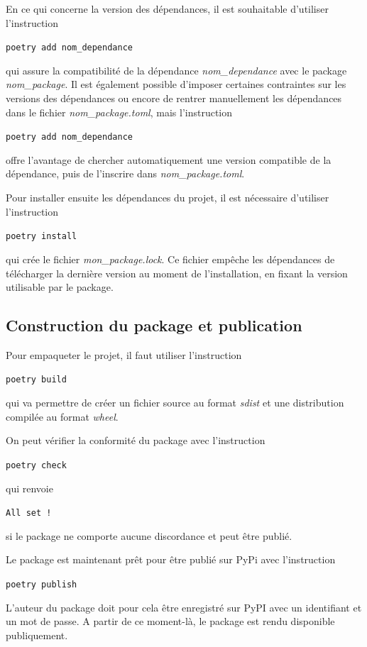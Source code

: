 \documentclass[twoside,a4paper,11pt,frenchb,openany]{report}
\begin{document}
En ce qui concerne la version des dépendances, il est souhaitable d’utiliser l’instruction
\begin{tcolorbox}\texttt{poetry add nom\_dependance}\end{tcolorbox}  
qui assure la compatibilité de la dépendance \textit{nom\_dependance} avec le package \textit{nom\_package}. Il est également possible d’imposer certaines contraintes sur les versions des dépendances ou encore de rentrer manuellement les dépendances dans le fichier \textit{nom\_package.toml}, mais l’instruction 
\begin{tcolorbox}\texttt{poetry add nom\_dependance}\end{tcolorbox}  
offre l’avantage de chercher automatiquement une version compatible de la dépendance, puis de l’inscrire dans \textit{nom\_package.toml}.

Pour installer ensuite les dépendances du projet, il est nécessaire d’utiliser l’instruction
\begin{tcolorbox}\texttt{poetry install}\end{tcolorbox}
qui crée le fichier \textit{mon\_package.lock}. Ce fichier empêche les dépendances de télécharger la dernière version au moment de l’installation, en fixant la version utilisable par le package.


\subsection{Construction du package et publication}

Pour empaqueter le projet, il faut utiliser l’instruction
\begin{tcolorbox}\texttt{poetry build}\end{tcolorbox}
qui va permettre de créer un fichier source au format \textit{sdist} et une distribution compilée au format \textit{wheel}.

On peut vérifier la conformité du package avec l’instruction
\begin{tcolorbox}\texttt{poetry check}\end{tcolorbox}
qui renvoie
\begin{tcolorbox}\texttt{All set !}\end{tcolorbox}
si le package ne comporte aucune discordance et peut être publié.

Le package est maintenant prêt pour être publié sur PyPi avec l’instruction
\begin{tcolorbox}\texttt{poetry publish}\end{tcolorbox}
L'auteur du package doit pour cela être enregistré sur PyPI avec un identifiant et un mot de passe.
A partir de ce moment-là, le package est rendu disponible publiquement.
\end{document}
